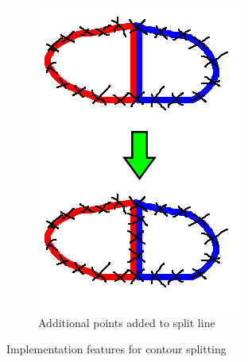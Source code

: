 \documentclass[11p, titlepage]{article}
\begin{document}
\begin{figure}[h!]
\begin{subfigure}[b]{0.35\textwidth}
         \includegraphics[width=\textwidth]{diagrams/split_line_points}
         \caption{Additional points added to split line}
         \label{fig:split_line_points}
     \end{subfigure}
        \caption{Implementation features for contour splitting}
        \label{fig:contour_splitting_features}
\end{figure}
\end{document}
